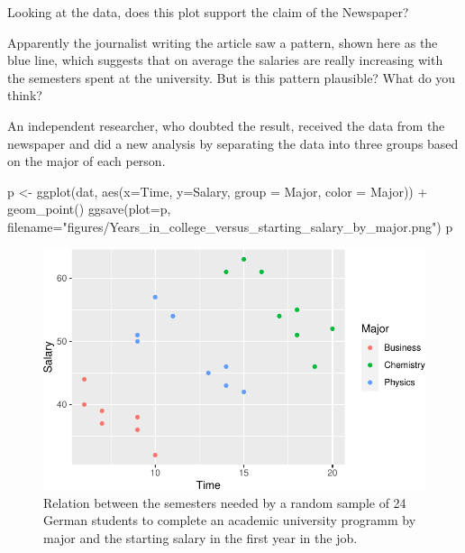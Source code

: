 \documentclass[
  letterpaper,
]{scrbook}
\newenvironment{Shaded}{\begin{snugshade}}{\end{snugshade}}
\newcommand{\AttributeTok}[1]{\textcolor[rgb]{0.40,0.45,0.13}{#1}}
\newcommand{\FunctionTok}[1]{\textcolor[rgb]{0.28,0.35,0.67}{#1}}
\newcommand{\NormalTok}[1]{\textcolor[rgb]{0.00,0.23,0.31}{#1}}
\newcommand{\OtherTok}[1]{\textcolor[rgb]{0.00,0.23,0.31}{#1}}
\newcommand{\SpecialCharTok}[1]{\textcolor[rgb]{0.37,0.37,0.37}{#1}}
\newcommand{\StringTok}[1]{\textcolor[rgb]{0.13,0.47,0.30}{#1}}
\begin{document}
Looking at the data, does this plot support the claim of the Newspaper?

Apparently the journalist writing the article saw a pattern, shown here
as the blue line, which suggests that on average the salaries are really
increasing with the semesters spent at the university. But is this
pattern plausible? What do you think?

An independent researcher, who doubted the result, received the data
from the newspaper and did a new analysis by separating the data into
three groups based on the major of each person.

\begin{Shaded}
\begin{Highlighting}[]
\NormalTok{p }\OtherTok{\textless{}{-}} \FunctionTok{ggplot}\NormalTok{(dat, }\FunctionTok{aes}\NormalTok{(}\AttributeTok{x=}\NormalTok{Time, }\AttributeTok{y=}\NormalTok{Salary, }\AttributeTok{group =}\NormalTok{ Major, }\AttributeTok{color =}\NormalTok{ Major)) }\SpecialCharTok{+}
     \FunctionTok{geom\_point}\NormalTok{()}
\FunctionTok{ggsave}\NormalTok{(}\AttributeTok{plot=}\NormalTok{p, }\AttributeTok{filename=}\StringTok{"figures/Years\_in\_college\_versus\_starting\_salary\_by\_major.png"}\NormalTok{)}
\NormalTok{p}
\end{Highlighting}
\end{Shaded}

\begin{figure}[H]

{\centering \includegraphics{./introduction_files/figure-pdf/Years_in_college_versus_starting_salary_by_major-1.pdf}

}

\caption{Relation between the semesters needed by a random sample of 24
German students to complete an academic university programm by major and
the starting salary in the first year in the job.}

\end{figure}
\end{document}
